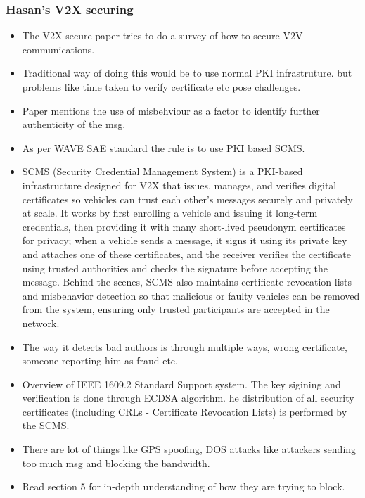 \documentclass[fleqn,10pt]{olplainarticle}
\begin{document}
\subsubsection{Hasan's V2X securing}
\begin{itemize}
    \item The V2X secure paper \cite{hasan2020securing} tries to do a survey of how to secure V2V communications.
    \item Traditional way of doing this would be to use normal PKI infrastruture. but problems like time taken to verify certificate etc pose challenges.
    \item Paper mentions the use of misbehviour as a factor to identify further authenticity of the msg.
    \item As per WAVE SAE standard the rule is to use PKI based \href{https://autocrypt.io/security-credential-management-system/}{SCMS}.
    \item SCMS (Security Credential Management System) is a PKI-based infrastructure designed for V2X that issues, manages, and verifies digital certificates so vehicles can trust each other’s messages securely and privately at scale. It works by first enrolling a vehicle and issuing it long-term credentials, then providing it with many short-lived pseudonym certificates for privacy; when a vehicle sends a message, it signs it using its private key and attaches one of these certificates, and the receiver verifies the certificate using trusted authorities and checks the signature before accepting the message. Behind the scenes, SCMS also maintains certificate revocation lists and misbehavior detection so that malicious or faulty vehicles can be removed from the system, ensuring only trusted participants are accepted in the network.
    \item The way it detects bad authors is through multiple ways, wrong certificate, someone reporting him as fraud etc.
    \item Overview of IEEE 1609.2 Standard Support system. The key sigining and verification is done through ECDSA algorithm. he distribution of all security certificates (including
    CRLs - Certificate Revocation Lists) is performed by the SCMS.
    \item There are lot of things like GPS spoofing, DOS attacks like attackers sending too much msg and blocking the bandwidth. 
    \item Read section 5 for in-depth understanding of how they are trying to block.
\end{itemize}
\end{document}
